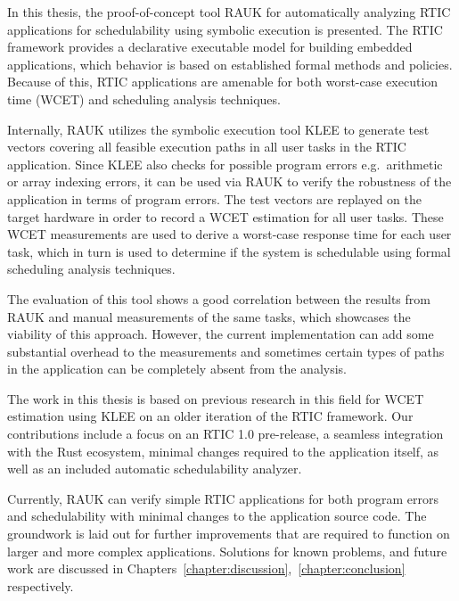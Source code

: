 In this thesis, the proof-of-concept tool RAUK for automatically analyzing
RTIC applications for schedulability using symbolic execution is presented.
The RTIC framework provides a declarative executable model for building
embedded applications, which behavior is based on established formal methods
and policies. Because of this, RTIC applications are amenable for both
worst-case execution time (WCET) and scheduling analysis techniques.

Internally, RAUK utilizes the symbolic execution tool KLEE to generate test vectors
covering all feasible execution paths in all user tasks in the RTIC
application. Since KLEE also checks for possible program errors e.g.\ arithmetic or
array indexing errors, it can be used via RAUK to verify the robustness of the
application in terms of program errors. The test vectors are replayed on the
target hardware in order to record a WCET estimation for all user
tasks. These WCET measurements are used to derive a worst-case response time
for each user task, which in turn is used to determine if the system is
schedulable using formal scheduling analysis techniques.

The evaluation of this tool shows a good correlation between the results from
RAUK and manual measurements of the same tasks, which showcases the viability
of this approach. However, the current implementation can add some substantial
overhead to the measurements and sometimes certain types of paths in the
application can be completely absent from the analysis.

The work in this thesis is based on previous research in this field for WCET
estimation using KLEE on an older iteration of the RTIC framework. Our
contributions include a focus on an RTIC 1.0 pre-release, a seamless
integration with the Rust ecosystem, minimal changes required to the
application itself, as well as an included automatic schedulability analyzer.

Currently, RAUK can verify simple RTIC applications for both program errors and
schedulability with minimal changes to the application source code. The
groundwork is laid out for further improvements that are required to function
on larger and more complex applications. Solutions for known problems, and future work
are discussed in Chapters~\ref{chapter:discussion},~\ref{chapter:conclusion} respectively.
